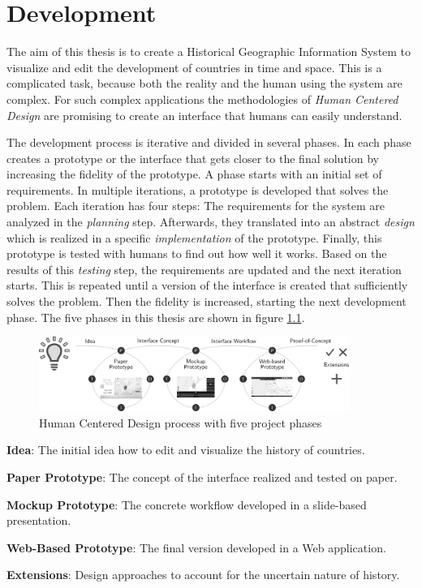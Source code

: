 
\chapter{Development} %
\label{cha:development}

The aim of this thesis is to create a Historical Geographic Information System to visualize and edit the development of countries in time and space. This is a complicated task, because both the reality and the human using the system are complex. For such complex applications the methodologies of \emph{Human Centered Design} are promising to create an interface that humans can easily understand.

The development process is iterative and divided in several phases. In each phase creates a prototype or the interface that gets closer to the final solution by increasing the fidelity of the prototype. A phase starts with an initial set of requirements. In multiple iterations, a prototype is developed that solves the problem. Each iteration has four steps: The requirements for the system are analyzed in the \emph{planning} step. Afterwards, they translated into an abstract \emph{design} which is realized in a specific \emph{implementation} of the prototype. Finally, this prototype is tested with humans to find out how well it works. Based on the results of this \emph{testing} step, the requirements are updated and the next iteration starts. This is repeated until a version of the interface is created that sufficiently solves the problem. Then the fidelity is increased, starting the next development phase. The five phases in this thesis are shown in figure \ref{fig:human_centered_design}.

\begin{figure}[H]
  \vspace{1em}
  \centering
  \includegraphics[width=0.9\textwidth]{graphics/development/human_centered_design}
  \caption{Human Centered Design process with five project phases}
  \label{fig:human_centered_design}
\end{figure}

\newpage
\begin{compactenum}
  \item \textbf{Idea}: The initial idea how to edit and visualize the history of countries.
  \item \textbf{Paper Prototype}: The concept of the interface realized and tested on paper.
  \item \textbf{Mockup Prototype}: The concrete workflow developed in a slide-based presentation.
  \item \textbf{Web-Based Prototype}: The final version developed in a Web application.
  \item \textbf{Extensions}: Design approaches to account for the uncertain nature of history.
\end{compactenum}

